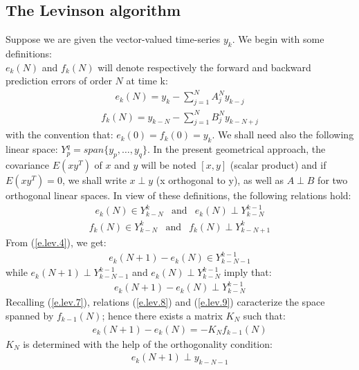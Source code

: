\subsection{The Levinson algorithm}
\label{levalgor}
Suppose we are given the vector-valued time-series $y_k$. 
We begin with some definitions:\\
$e_k(N)$ and $f_k(N)$ will denote respectively the forward and backward
prediction errors of order $N$ at time k:
\begin{eqnarray}
e_k(N)=y_k-\sum_{j=1}^N A^N_jy_{k-j}
\label{e.lev.4}
\end{eqnarray}
\begin{eqnarray}
f_k(N)=y_{k-N}-\sum_{j=1}^N B^N_jy_{k-N+j}
\label{e.lev.5}
\end{eqnarray}
with the convention that: $e_k(0)=f_k(0)=y_k$.
We shall need also the following linear space: 
$Y^q_p=span\{y_p, \ldots , y_q\}$.
In the present geometrical approach, the covariance $E(xy^T)$ of 
$x$ and $y$ will be noted $[x,y]$ (scalar product) and if 
$E(xy^T)=0$, we shall write $x\; \bot \; y$ (x orthogonal to y), as well as 
$A\; \bot \; B$ for two orthogonal linear spaces.
In view of these definitions, the following relations hold:
\begin{eqnarray}
e_k(N)\in Y^k_{k-N} & \mbox{and} & e_k(N) \; \bot \; Y^{k-1}_{k-N}
\label{e.lev.6}
\end{eqnarray}
\begin{eqnarray}
f_k(N)\in Y^k_{k-N} & \mbox{and} & f_k(N) \; \bot \; Y^{k}_{k-N+1}
\label{e.lev.7}
\end{eqnarray}
From (\ref{e.lev.4}), we get:
\begin{eqnarray}
e_k(N+1)-e_k(N)\in Y^{k-1}_{k-N-1}
\label{e.lev.8}
\end{eqnarray}
while $e_k(N+1) \; \bot \; Y^{k-1}_{k-N-1}$ and $e_k(N) \; \bot \; Y^{k-1}_{k-N}$
imply that: 
\begin{eqnarray}
e_k(N+1)-e_k(N) \; \bot \; Y^{k-1}_{k-N}
\label{e.lev.9}
\end{eqnarray}
Recalling (\ref{e.lev.7}), relations (\ref{e.lev.8}) and (\ref{e.lev.9}) 
caracterize the space spanned by $f_{k-1}(N)$; hence there exists a 
matrix $K_N$ such that:
\begin{eqnarray}
e_k(N+1)-e_k(N)=-K_Nf_{k-1}(N)
\label{e.lev.10}
\end{eqnarray}
$K_N$ is determined with the help of the orthogonality condition: 
\begin{eqnarray}
e_k(N+1) \; \bot \; y_{k-N-1}
\label{e.lev.11}
\end{eqnarray}
